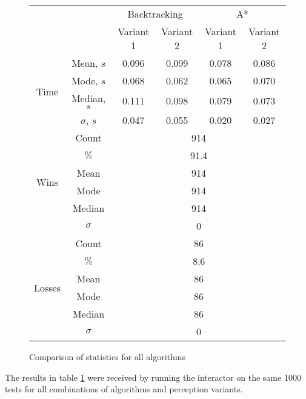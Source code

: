 \documentclass{article}
\begin{document}
\begin{figure}[H]
    \centering
    \begin{tabular}{c|c|c|c|c|c}
        \multicolumn{2}{c}{} & \multicolumn{2}{|c}{Backtracking} & \multicolumn{2}{|c}{A*} \\
        \cline{3-6}
        \multicolumn{2}{c|}{} & Variant 1 & Variant 2 & Variant 1 & Variant 2 \\
        \hline
        \hline
        \multirow{4}{*}{Time} & Mean, $s$ & 0.096 & 0.099 & 0.078 & 0.086 \\
        \cline{2-6}
        & Mode, $s$ & 0.068 & 0.062 & 0.065 & 0.070 \\
        \cline{2-6}
        & Median, $s$ & 0.111 & 0.098 & 0.079 & 0.073 \\
        \cline{2-6}
        & $\sigma$, $s$ & 0.047 & 0.055 & 0.020 & 0.027 \\
        \hline
        \multirow{6}{*}{Wins} & Count & \multicolumn{4}{c}{914} \\
        \cline{2-6}
        & $\%$ & \multicolumn{4}{c}{91.4} \\
        \cline{2-6}
        & Mean & \multicolumn{4}{c}{914} \\
        \cline{2-6}
        & Mode & \multicolumn{4}{c}{914} \\
        \cline{2-6}
        & Median & \multicolumn{4}{c}{914} \\
        \cline{2-6}
        & $\sigma$ & \multicolumn{4}{c}{0} \\
        \hline
        \multirow{6}{*}{Losses} & Count & \multicolumn{4}{c}{86} \\
        \cline{2-6}
        & $\%$ & \multicolumn{4}{c}{8.6} \\
        \cline{2-6}
        & Mean & \multicolumn{4}{c}{86} \\
        \cline{2-6}
        & Mode & \multicolumn{4}{c}{86} \\
        \cline{2-6}
        & Median & \multicolumn{4}{c}{86} \\
        \cline{2-6}
        & $\sigma$ & \multicolumn{4}{c}{0} \\
    \end{tabular}
    \caption{Comparison of statistics for all algorithms}
    \label{fig:statistics}
\end{figure}

The results in table \ref{fig:statistics} were received by running the interactor on the same 1000 tests for all combinations of algorithms and perception variants.
\end{document}
